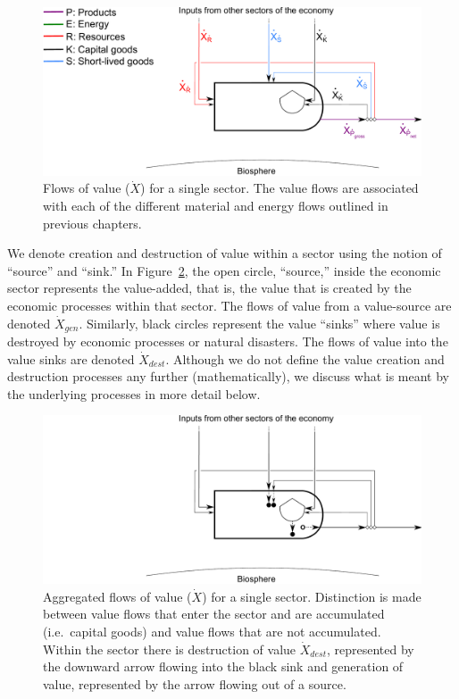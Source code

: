 \begin{figure}[!ht]
\centering
\includegraphics[width=0.8\linewidth]{Part_2/Chapter_Values/images/PERKS_basic_unit_value_all.pdf}
\caption[Flows of value for a single sector]{Flows of value ($\dot{X}$) 
for a single sector. 
The value flows are associated with each of the different 
material and energy flows outlined in previous chapters.}
\label{fig:basic_value} 
\end{figure}

We denote creation and destruction
of value within a sector using the notion of ``source'' and ``sink.''
In Figure~\ref{fig:basic_value_aggregated}, the open circle, 
``source,'' inside the economic sector represents the value-added,
that is, the value that is created by the economic processes within that sector. 
The flows of value from a value-source are denoted $\dot{X}_{gen}$. 
Similarly, black circles represent the value ``sinks''  where value is destroyed 
by economic  processes or natural disasters. 
The flows of value into the value sinks are denoted $\dot{X}_{dest}$. 
Although we do not define 
the value creation and destruction processes any further (mathematically), 
we discuss what is meant by the
underlying processes in more detail below.


\begin{figure}[!ht]
\centering
\includegraphics[width=0.8\linewidth]{Part_2/Chapter_Values/images/PERKS_basic_unit_value.pdf}
\caption[Aggregated flows of value for a single sector]{Aggregated flows of value ($\dot{X}$) 
for a single sector. 
Distinction is made between value flows that 
enter the sector and are accumulated (i.e.\ capital goods) 
and value flows that are not accumulated. 
Within the sector there is destruction of value $\dot{X}_{dest}$, 
represented by the downward arrow flowing 
into the black sink and generation of value, 
represented by the arrow flowing out of a source. }
\label{fig:basic_value_aggregated} 
\end{figure}



